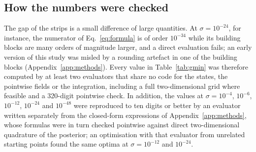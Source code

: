\subsection{How the numbers were checked}

The gap of the strips is a small difference of large quantities. At $\sigma = 10^{-24}$, for instance, the numerator of Eq.~\eqref{eq:formula} is of order $10^{-34}$ while its building blocks are many orders of magnitude larger, and a direct evaluation fails; an early version of this study was misled by a rounding artefact in one of the building blocks (Appendix~\ref{app:methods}). Every value in Table~\ref{tab:gmin} was therefore computed by at least two evaluators that share no code for the states, the pointwise fields or the integration, including a full two-dimensional grid where feasible and a 320-digit pointwise check. In addition, the values at $\sigma = 10^{-4}$, $10^{-6}$, $10^{-12}$, $10^{-24}$ and $10^{-48}$ were reproduced to ten digits or better by an evaluator written separately from the closed-form expressions of Appendix~\ref{app:methods}, whose formulas were in turn checked pointwise against direct two-dimensional quadrature of the posterior; an optimisation with that evaluator from unrelated starting points found the same optima at $\sigma = 10^{-12}$ and $10^{-24}$.
